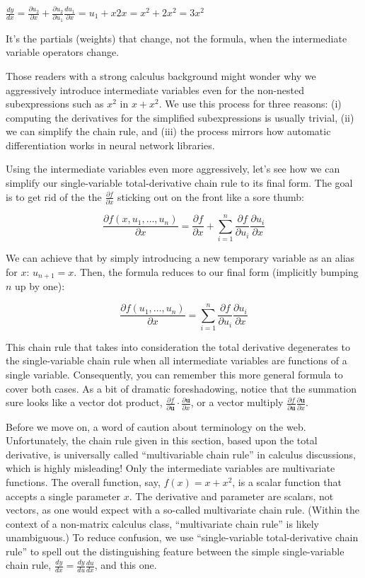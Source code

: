 \documentclass[11pt]{article}
\begin{document}
$\frac{dy}{dx} = \frac{\partial u_2}{\partial x} + \frac{\partial u_2}{\partial u_1}\frac{d u_1}{\partial  x} = u_1 + x 2x = x^2 + 2x^2 = 3x^2$

It's the partials (weights) that change, not the formula, when the intermediate variable operators change.

Those readers with a strong calculus background might wonder why we aggressively introduce intermediate variables even for the non-nested subexpressions such as $x^2$ in $x+x^2$. We use this process for three reasons: (i) computing the derivatives for the simplified subexpressions is usually trivial, (ii) we can simplify the chain rule, and (iii) the process mirrors how automatic differentiation works in neural network libraries.

Using the intermediate variables even more aggressively, let's see how we can simplify our single-variable total-derivative chain rule to its final form. The goal is to get rid of the the $\frac{\partial f}{\partial x}$ sticking out on the front like a sore thumb:

\[
\frac{\partial f(x,u_1,\ldots,u_n)}{\partial x} = \frac{\partial f}{\partial x} + \sum_{i=1}^n \frac{\partial f}{\partial u_i}\frac{\partial  u_i}{\partial  x}
\]

We can achieve that by simply introducing a new temporary variable as an alias for $x$: $u_{n+1} = x$. Then, the formula reduces to our final form (implicitly bumping $n$ up by one):

\[
\frac{\partial f(u_1,\ldots,u_n)}{\partial x} = \sum_{i=1}^n \frac{\partial f}{\partial u_i}\frac{\partial  u_i}{\partial  x}
\]

This chain rule that takes into consideration the total derivative degenerates to the single-variable chain rule when all intermediate variables are functions of a single variable.   Consequently, you can remember this more general formula to cover both cases.  As a bit of dramatic foreshadowing, notice that the summation sure looks like a vector dot product, $\frac{\partial f}{\partial \mathbf{u}} \cdot \frac{\partial \mathbf{u}}{\partial x}$, or  a vector multiply $\frac{\partial f}{\partial \mathbf{u}} \frac{\partial \mathbf{u}}{\partial x}$. 
 
Before we move on, a word of caution about terminology on the web. Unfortunately, the chain rule given in this section, based upon the total derivative, is universally called ``multivariable chain rule'' in calculus discussions, which is highly misleading! Only the intermediate variables are multivariate functions. The overall function, say, $f(x) = x + x^2$, is a scalar function that accepts a single parameter $x$. The derivative and parameter are scalars, not vectors, as one would expect with a so-called multivariate chain rule.  (Within the context of a non-matrix calculus class, ``multivariate chain rule'' is likely unambiguous.) To reduce confusion, we use ``single-variable total-derivative chain rule'' to spell out the distinguishing feature between the simple single-variable chain rule, $\frac{dy}{dx} = \frac{dy}{du}\frac{du}{dx}$, and this one. 
\end{document}
